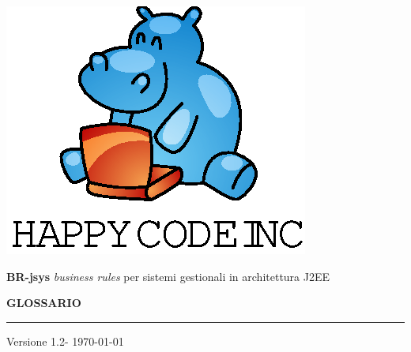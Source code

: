 \documentclass[11pt,titlepage,a4paper]{report}
\begin{document}
\newcommand{\lv}{1.2} %



\begin{titlepage}
\begin{center}
\vspace*{0.5in}
\includegraphics{logo.eps}
\vspace*{0.2in}

{\Large \textbf{BR-jsys}}
{\Large \emph{business rules} per sistemi gestionali in architettura J2EE } 
\vspace{2in}

\LARGE \textbf {GLOSSARIO}
\par\rule{10cm}{0.4pt} \par {\large Versione \lv - \today}


\end{center}
\end{titlepage}
\vspace*{0.5in}
\end{document}
